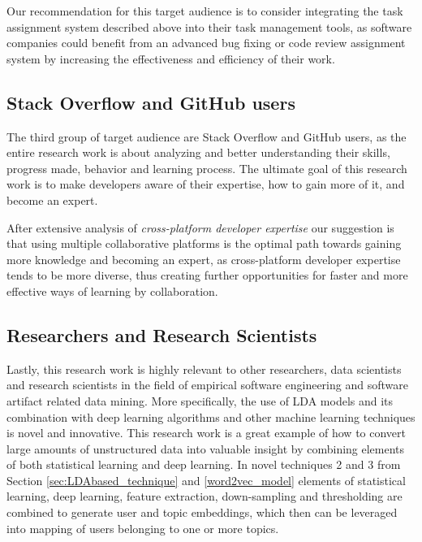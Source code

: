             Our recommendation for this target audience is to consider integrating the task assignment system described above into their task management tools, as software companies could benefit from an advanced bug fixing or code review assignment system by increasing the effectiveness and efficiency of their work.
        
        \subsection{Stack Overflow and GitHub users}
            The third group of target audience are Stack Overflow and GitHub users, as the entire research work is about analyzing and better understanding their skills, progress made, behavior and learning process. The ultimate goal of this research work is to make developers aware of their expertise, how to gain more of it, and become an expert. 
            
            After extensive analysis of \emph{cross-platform developer expertise} our suggestion is that using multiple collaborative platforms is the optimal path towards gaining more knowledge and becoming an expert, as cross-platform developer expertise tends to be more diverse, thus creating further opportunities for faster and more effective ways of learning by collaboration. 
            
        \subsection{Researchers and Research Scientists}
        
            Lastly, this research work is highly relevant to other researchers, data scientists and research scientists in the field of empirical software engineering and software artifact related data mining. More specifically, the use of LDA models and its combination with deep learning algorithms and other machine learning techniques is novel and innovative. This research work is a great example of how to convert large amounts of unstructured data into valuable insight by combining elements of both statistical learning and deep learning. In novel techniques 2 and 3 from Section \ref{sec:LDAbased_technique} and \ref{word2vec_model} elements of statistical learning, deep learning, feature extraction, down-sampling and thresholding are combined to generate user and topic embeddings, which then can be leveraged into mapping of users belonging to one or more topics. 
            
